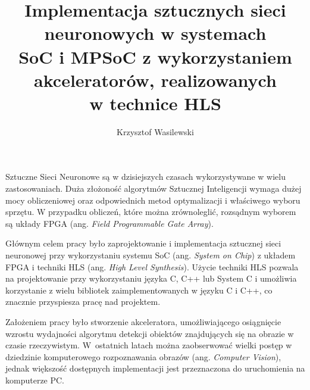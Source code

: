 \documentclass[
    left=2.5cm,         %
    right=2.5cm,        %
    top=2.5cm,          %
    bottom=3cm,         %
    bindingoffset=6mm,  %
    nohyphenation=false %
]{eiti/eiti-thesis}
\begin{document}
\MasterThesis %
{}
\title{
    Implementacja sztucznych sieci neuronowych w systemach\\
    SoC i MPSoC z wykorzystaniem akceleratorów, realizowanych\\w technice HLS
}
\author{Krzysztof Wasilewski}
\date{\the\year}
\maketitle

\cleardoublepage %

\streszczenie
Sztuczne Sieci Neuronowe są w dzisiejszych czasach wykorzystywane w wielu 
zastosowaniach. Duża złożoność algorytmów Sztucznej Inteligencji wymaga 
dużej mocy obliczeniowej oraz odpowiednich metod optymalizacji 
i właściwego wyboru sprzętu. W przypadku obliczeń, które można 
zrównoleglić, rozsądnym wyborem są układy FPGA (ang. \emph{Field Programmable Gate 
Array}). 

Głównym celem pracy było zaprojektowanie i implementacja sztucznej sieci
neuronowej przy wykorzystaniu systemu SoC (ang. \emph{System on Chip}) z układem 
FPGA i techniki HLS (ang. \emph{High Level Synthesis}). Użycie techniki HLS
pozwala na projektowanie przy wykorzystaniu języka C, C++ lub System 
C i umożliwia korzystanie z wielu bibliotek zaimplementowanych w języku 
C i C++, co znacznie przyspiesza pracę nad projektem.

Założeniem pracy było stworzenie akceleratora, umożliwiającego osiągnięcie
wzrostu wydajności algorytmu detekcji obiektów znajdujących się na 
obrazie w czasie rzeczywistym. W~ostatnich latach można zaobserwować 
wielki postęp w dziedzinie komputerowego rozpoznawania obrazów 
(ang. \emph{Computer Vision}), jednak większość dostępnych implementacji jest 
przeznaczona do uruchomienia na komputerze PC.
\end{document}

